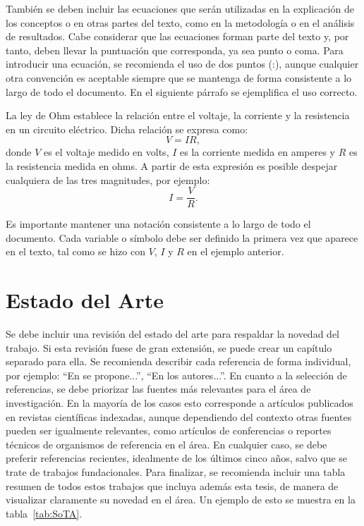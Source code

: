 \begin{figure}[h]
    \centering
    \shorthandoff{>}
    
    \shorthandon{>}
    \label{img:Adaptado}
\end{figure}

También se deben incluir las ecuaciones que serán utilizadas en la explicación de los conceptos o en otras partes del texto, como en la metodología o en el análisis de resultados. Cabe considerar que las ecuaciones forman parte del texto y, por tanto, deben llevar la puntuación que corresponda, ya sea punto o coma. Para introducir una ecuación, se recomienda el uso de dos puntos (:), aunque cualquier otra convención es aceptable siempre que se mantenga de forma consistente a lo largo de todo el documento. En el siguiente párrafo se ejemplifica el uso correcto.

La ley de Ohm establece la relación entre el voltaje, la corriente y la resistencia en un circuito eléctrico. Dicha relación se expresa como:
\begin{equation}
    V = IR,
    \label{eq:ohm}
\end{equation}
donde $V$ es el voltaje medido en volts, $I$ es la corriente medida en amperes y $R$ es la resistencia medida en ohms. A partir de esta expresión es posible despejar cualquiera de las tres magnitudes, por ejemplo:
\begin{equation}
    I = \frac{V}{R}.
    \label{eq:ohm_despejada}
\end{equation}

Es importante mantener una notación consistente a lo largo de todo el documento. Cada variable o símbolo debe ser definido la primera vez que aparece en el texto, tal como se hizo con $V$, $I$ y $R$ en el ejemplo anterior. 

\section{Estado del Arte}
Se debe incluir una revisión del estado del arte para respaldar la novedad del trabajo. Si esta revisión fuese de gran extensión, se puede crear un capítulo separado para ella. Se recomienda describir cada referencia de forma individual, por ejemplo: ``En \cite{Shannon1948} se propone...'', ``En \cite{Shannon1948} los autores...''. En cuanto a la selección de referencias, se debe priorizar las fuentes más relevantes para el área de investigación. En la mayoría de los casos esto corresponde a artículos publicados en revistas científicas indexadas, aunque dependiendo del contexto otras fuentes pueden ser igualmente relevantes, como artículos de conferencias o reportes técnicos de organismos de referencia en el área. En cualquier caso, se debe preferir referencias recientes, idealmente de los últimos cinco años, salvo que se trate de trabajos fundacionales. Para finalizar, se recomienda incluir una tabla resumen de todos estos trabajos que incluya además esta tesis, de manera de visualizar claramente su novedad en el área. Un ejemplo de esto se muestra en la tabla~\ref{tab:SoTA}.

